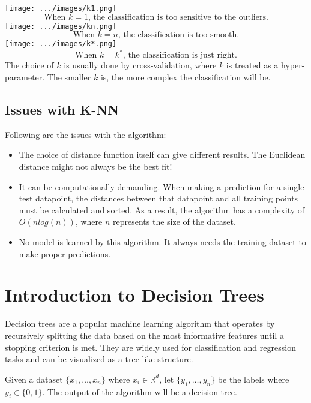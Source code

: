 \documentclass[
]{article}
\providecommand{\tightlist}{%
  \setlength{\itemsep}{0pt}\setlength{\parskip}{0pt}}
\begin{document}
\texttt{[image: .../images/k1.png]} \[
\text{When }k=1\text{, the classification is too sensitive to the outliers.}
\] \texttt{[image: .../images/kn.png]} \[
\text{When }k=n\text{, the classification is too smooth.}
\] \texttt{[image: .../images/k*.png]} \[
\text{When }k=k^*\text{, the classification is just right.}
\] The choice of \(k\) is usually done by cross-validation, where \(k\)
is treated as a hyper-parameter. The smaller \(k\) is, the more complex
the classification will be.

\newpage
\hypertarget{issues-with-k-nn}{%
\subsection{Issues with K-NN}\label{issues-with-k-nn}}

Following are the issues with the algorithm:

\begin{itemize}
\tightlist
\item
  The choice of distance function itself can give different results. The
  Euclidean distance might not always be the best fit!
\item
  It can be computationally demanding. When making a prediction for a
  single test datapoint, the distances between that datapoint and all
  training points must be calculated and sorted. As a result, the
  algorithm has a complexity of \(O(nlog(n))\), where \(n\) represents
  the size of the dataset.
\item
  No model is learned by this algorithm. It always needs the training
  dataset to make proper predictions.
\end{itemize}

\newpage
\hypertarget{introduction-to-decision-trees}{%
\section{Introduction to Decision
Trees}\label{introduction-to-decision-trees}}

Decision trees are a popular machine learning algorithm that operates by
recursively splitting the data based on the most informative features
until a stopping criterion is met. They are widely used for
classification and regression tasks and can be visualized as a tree-like
structure.

Given a dataset \(\{x_1, \ldots, x_n\}\) where \(x_i \in \mathbb{R}^d\),
let \(\{y_1, \ldots, y_n\}\) be the labels where \(y_i \in \{0, 1\}\).
The output of the algorithm will be a decision tree.
\end{document}
